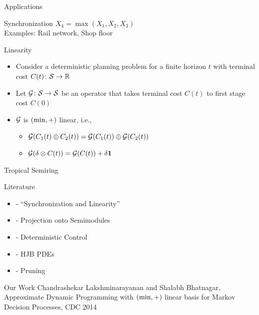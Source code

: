 \documentclass[10pt,handout]{beamer}
\begin{document}
\begin{frame}[fragile]{Applications}
\begin{block}{Synchronization}
$X_4=\max(X_1,X_2,X_3)$\\
Examples: Rail network, Shop floor
\end{block}


\begin{block}{Linearity}
\begin{itemize}
\item Consider a deterministic planning problem for a finite horizon $t$ with terminal cost $C(t)\colon \mathcal{S}\rightarrow \mathbb{R}$
\item Let $\mathcal{G}\colon \mathcal{S}\rightarrow \mathcal{S}$ be an operator that takes terminal cost $C(t)$ to first stage cost $C(0)$
\item $\mathcal{G}$ is $(\min,+)$ linear, i.e.,
        \begin{itemize}
        \item $\mathcal{G}(C_1(t)\oplus C_2(t))=\mathcal{G}(C_1(t))\oplus \mathcal{G}(C_2(t))$
        \item $\mathcal{G}(\delta\otimes C(t))=\mathcal{G}(C(t))+\delta\mathbf{1}$
        \end{itemize}
\end{itemize}
\end{block}

\end{frame}


\begin{frame}[fragile]{Tropical Semiring}
\begin{block}{Literature}
\begin{itemize}
\item \cite{baccelli1994synchronization} - ``Synchronization and Linearity''
\item \cite{cohen1996kernels} - Projection onto Semimodules
\item \cite{akian2008max} - Deterministic Control
\item \cite{mceneaney2008curse,mceneaney2009convergence} - HJB PDEs
\item \cite{gaubert2011curse} - Pruning
\end{itemize}

\end{block}
\begin{block}{Our Work}
Chandrashekar Lakshminarayanan and Shalabh Bhatnagar, Approximate Dynamic Programming with $(\min,+)$ linear basis for Markov Decision Processes, CDC 2014
\end{block}
\end{frame}
\end{document}
